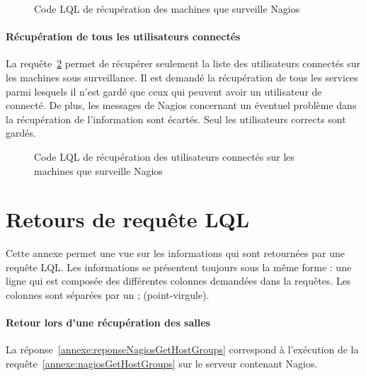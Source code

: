 \begin{appendices}
\begin{figure}[!ht]
	
	\caption{Code LQL de r\'ecup\'eration des machines que surveille Nagios}
	\label{annexe:nagiosGetResources}

\end{figure}

\subsubsection{R\'ecup\'eration de tous les utilisateurs connect\'es}

La requ\^ete~\ref{annexe:nagiosGetUsersLogged} permet de r\'ecup\'erer seulement la liste des utilisateurs connect\'es sur les machines sous surveillance.
Il est demand\'e la r\'ecup\'eration de tous les services parmi lesquels il n'est gard\'e que ceux qui peuvent avoir un utilisateur de connect\'e.
De plus, les messages de Nagios concernant un \'eventuel probl\`eme dans la r\'ecup\'eration de l'information sont \'ecart\'es.
Seul les utilisateurs \og corrects\fg{} sont gard\'es.

\vspace{0.20cm}

\begin{figure}[!ht]
	
	\caption{Code LQL de r\'ecup\'eration des utilisateurs connect\'es sur les machines que surveille Nagios}
	\label{annexe:nagiosGetUsersLogged}

\end{figure}

\chapter{Retours de requ\^ete LQL}
\label{chapterAnnexe:reponseLQLNagios}

Cette annexe permet une vue sur les informations qui sont retourn\'ees par une requ\^ete LQL.
Les informations se pr\'esentent toujours sous la m\^eme forme : une ligne qui est compos\'ee des diff\'erentes colonnes demand\'ees dans la requ\^etes.
Les colonnes sont s\'epar\'ees par un \textsf{; (point-virgule)}.

\subsubsection{Retour lors d'une r\'ecup\'eration des salles}

La r\'eponse~\ref{annexe:reponseNagiosGetHostGroups} correspond \`a l'ex\'ecution de la requ\^ete~\ref{annexe:nagiosGetHostGroups} sur le serveur contenant Nagios.


\end{appendices}

